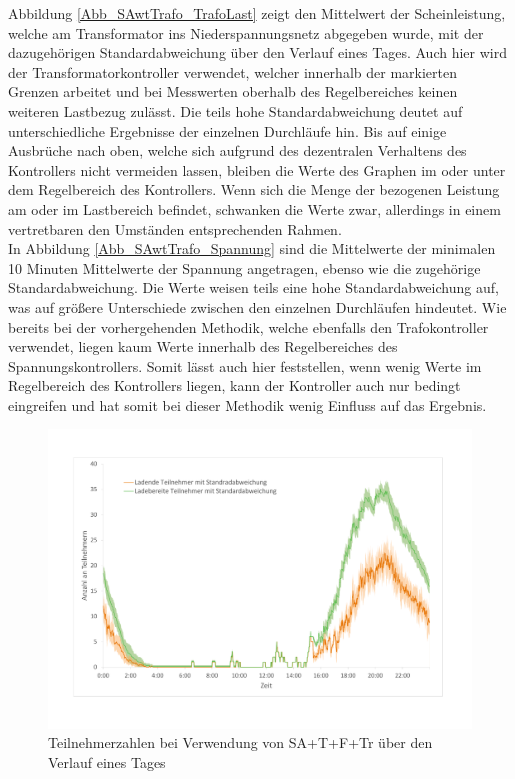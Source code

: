 Abbildung \ref{Abb_SAwtTrafo_TrafoLast} zeigt den Mittelwert der Scheinleistung, welche am Transformator ins Niederspannungsnetz abgegeben wurde, mit der dazugehörigen Standardabweichung über den Verlauf eines Tages. Auch hier wird der Transformatorkontroller verwendet, welcher innerhalb der markierten Grenzen arbeitet und bei Messwerten oberhalb des Regelbereiches keinen weiteren Lastbezug zulässt. Die teils hohe Standardabweichung deutet auf unterschiedliche Ergebnisse der einzelnen Durchläufe hin. Bis auf einige Ausbrüche nach oben, welche sich aufgrund des dezentralen Verhaltens des Kontrollers nicht vermeiden lassen, bleiben die Werte des Graphen im oder unter dem Regelbereich des Kontrollers. Wenn sich die Menge der bezogenen Leistung am oder im Lastbereich befindet, schwanken die Werte zwar, allerdings in einem vertretbaren den Umständen entsprechenden Rahmen.\\
In Abbildung \ref{Abb_SAwtTrafo_Spannung} sind die Mittelwerte der minimalen 10 Minuten Mittelwerte der Spannung angetragen, ebenso wie die zugehörige Standardabweichung. Die Werte weisen teils eine hohe Standardabweichung auf, was auf größere Unterschiede zwischen den einzelnen Durchläufen hindeutet. Wie bereits bei der vorhergehenden Methodik, welche ebenfalls den Trafokontroller verwendet, liegen kaum Werte innerhalb des Regelbereiches des Spannungskontrollers. Somit lässt auch hier feststellen, wenn wenig Werte im Regelbereich des Kontrollers liegen, kann der Kontroller auch nur bedingt eingreifen und hat somit bei dieser Methodik wenig Einfluss auf das Ergebnis.\\
\begin{figure}[htb]
\centering
	\includegraphics[scale=0.45]{img/SA_wT_trafo/Teilnehmer2.pdf}
	\caption{Teilnehmerzahlen bei Verwendung von SA+T+F+Tr über den Verlauf eines Tages}
	\label{Abb_SAwtTrafo_Teilnehmer}
\end{figure}

